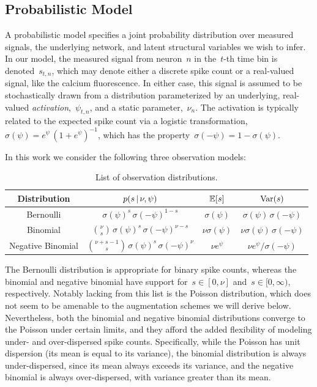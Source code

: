 \subsection{Probabilistic Model}
A probabilistic model specifies a joint probability distribution over
measured signals, the underlying network, and latent structural
variables we wish to infer.  In our model, the measured signal from
neuron~$n$ in the~$t$-th time bin is denoted~$s_{t,n}$, which may 
denote either a discrete spike count or a real-valued signal, like 
the calcium fluorescence. In either case, this signal is assumed 
to be stochastically drawn from a distribution parameterized by 
an underlying, real-valued \emph{activation},~$\psi_{t,n}$,
and a static parameter,~$\nu_n$. The
activation is typically related to the expected spike count via
a logistic transformation,~$\sigma(\psi) = e^\psi \, (1+e^\psi)^{-1}$,
which has the property~$\sigma(-\psi) = 1-\sigma(\psi)$.

In this work we consider the following three observation models:
\begin{table}
\begin{center}
\begin{tabular}{c|c|c|c}
  \textbf{Distribution} & $p(s \,|\, \nu, \psi)$ & $\mathbb{E}[s]$ & $\mathrm{Var}(s)$ \\
  \hline
  Bernoulli & $\sigma(\psi)^s \, \sigma(-\psi)^{1-s}$ & $\sigma(\psi)$ & $\sigma(\psi) \, \sigma(-\psi)$ \\
  Binomial & ${\nu \choose s} \, \sigma(\psi)^s \, \sigma(-\psi)^{\nu-s}$ & $\nu \sigma(\psi)$ & $\nu \sigma(\psi) \, \sigma(-\psi)$ \\
  Negative Binomial & ${\nu + s -1 \choose s} \, \sigma(\psi)^s \, \sigma(-\psi)^{\nu}$ & $\nu e^\psi$ & $\nu e^\psi / \sigma(-\psi)$ \\
\end{tabular}
\end{center}
\caption{List of observation distributions.}
\end{table}

The Bernoulli distribution is appropriate for binary spike counts,
whereas the binomial and negative binomial have support
for~$s\in[0,\nu]$ and~$s \in [0, \infty)$, respectively.
Notably lacking from this list is the Poisson distribution,
which does not seem to be amenable to the augmentation schemes
we will derive below. Nevertheless, both the binomial and negative
binomial distributions converge to the Poisson under certain
limits, and they afford the added flexibility of modeling under- and
over-dispersed spike counts. Specifically, while the Poisson has unit 
dispersion (its mean is equal to its variance), the binomial distribution 
is always under-dispersed, since its mean always exceeds its variance, 
and the negative binomial is always over-dispersed, with variance greater 
than its mean.


